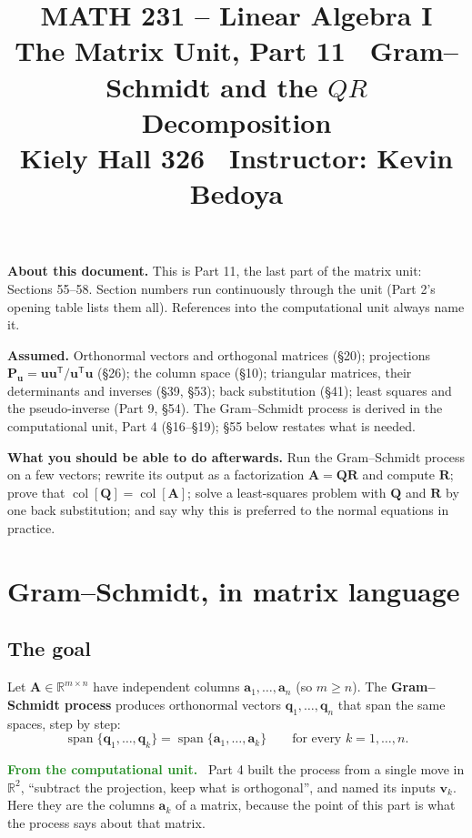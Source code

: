 \documentclass[11pt]{article}
\title{\vspace{-1.2cm}\textbf{\sffamily MATH 231 -- Linear Algebra I}\\[4pt]
       {\large\sffamily The Matrix Unit, Part 11 \textbullet\ Gram--Schmidt
        and the $QR$ Decomposition}\\[2pt]
       {\normalsize\sffamily Kiely Hall 326 \textbullet\
        Instructor: Kevin Bedoya}}
\author{}
\date{}
\theoremstyle{plain}
\theoremstyle{definition}
\theoremstyle{remark}
\newcommand{\lookback}[1][the vector unit]{\par\smallskip\noindent
  \textbf{\sffamily\textcolor{ForestGreen}{From #1.}}\ \ignorespaces}
\newcommand{\R}{\mathbb{R}}
\newcommand{\vc}[1]{\mathbf{#1}}
\newcommand{\mt}[1]{\mathbf{#1}}
\newcommand{\T}{^{\mathsf{T}}}
\newcommand{\colsp}[1]{\operatorname{col}[#1]}
\DeclareMathOperator{\spanop}{span}
\begin{document}
\setcounter{section}{54}  %
\maketitle
\vspace{-1.6cm}

\noindent\textbf{About this document.} This is Part 11, the last part of the
matrix unit: Sections 55--58. Section numbers run continuously through the unit
(Part 2's opening table lists them all). References into the computational unit
always name it.

\medskip
\noindent\textbf{Assumed.} Orthonormal vectors and orthogonal matrices (\S20);
projections $\mt{P}_{\vc{u}}=\vc{u}\vc{u}\T/\vc{u}\T\vc{u}$ (\S26); the column
space (\S10); triangular matrices, their determinants and inverses (\S39, \S53);
back substitution (\S41); least squares and the pseudo-inverse (Part 9, \S54).
The Gram--Schmidt process is derived in the computational unit, Part 4
(\S16--\S19); \S55 below restates what is needed.

\medskip
\noindent\textbf{What you should be able to do afterwards.} Run the Gram--Schmidt
process on a few vectors; rewrite its output as a factorization
$\mt{A}=\mt{Q}\mt{R}$ and compute $\mt{R}$; prove that $\colsp{\mt{Q}}=\colsp{\mt{A}}$;
solve a least-squares problem with $\mt{Q}$ and $\mt{R}$ by one back
substitution; and say why this is preferred to the normal equations in practice.

\section{Gram--Schmidt, in matrix language}

\subsection{The goal}
Let $\mt{A}\in\R^{m\times n}$ have independent columns $\vc{a}_1,\dots,\vc{a}_n$
(so $m\ge n$). The \textbf{Gram--Schmidt process} produces orthonormal vectors
$\vc{q}_1,\dots,\vc{q}_n$ that span the same spaces, step by step:
\[
  \spanop\{\vc{q}_1,\dots,\vc{q}_k\}=\spanop\{\vc{a}_1,\dots,\vc{a}_k\}
  \qquad\text{for every }k=1,\dots,n .
\]
\lookback[the computational unit] Part 4 built the process from a single move in
$\R^{2}$, ``subtract the projection, keep what is orthogonal'', and named its
inputs $\vc{v}_k$. Here they are the columns $\vc{a}_k$ of a matrix, because the
point of this part is what the process says about that matrix.
\end{document}
